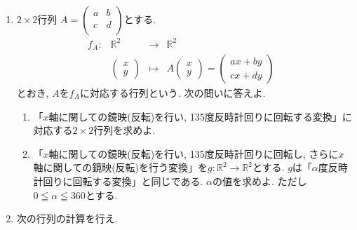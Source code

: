 \documentclass[dvipdfmx,a4paper,12pt]{article} %
\theoremstyle{definition}
\theoremstyle{definition}
\theoremstyle{remark}
\numberwithin{equation}{section}
\newcommand{\R}{\mathbb{R}}
\begin{document}
\begin{enumerate}[label={\large \textbf{第}\arabic*\textbf{問}.}]
\item   $2 \times 2$行列
$
A=\begin{pmatrix}
a& b \\
c& d \\
\end{pmatrix}
$とする. 
 $$
\begin{array}{ccccc}
f_A: &\R^2& \rightarrow & \R^2& \\
&\begin{pmatrix}
x \\ y
 \end{pmatrix} & \longmapsto & 
A
\begin{pmatrix}
x \\ y
 \end{pmatrix}  = 
 \begin{pmatrix}
ax + by \\ cx + dy
 \end{pmatrix}
 &
\end{array}
$$
とおき, $A$を$f_A$に対応する行列という. 次の問いに答えよ. 
 \begin{enumerate}[label=(\arabic*)]
   \setlength{\parskip}{0cm} %
  \setlength{\itemsep}{0cm} %
  \item 「$x$軸に関しての鏡映(反転)を行い, 135度反時計回りに回転する変換」に対応する$2 \times 2$行列を求めよ.
  \item 「$x$軸に関しての鏡映(反転)を行い, 135度反時計回りに回転し, さらに$x$軸に関しての鏡映(反転)を行う変換」を$g : \R^2 \to \R^2$とする. $g$は「$\alpha$度反時計回りに回転する変換」と同じである. $\alpha$の値を求めよ. 
  ただし$0 \leqq \alpha \leqq 360$とする.
  \end{enumerate}


\item 次の行列の計算を行え.
 

\end{enumerate}
\end{document}
